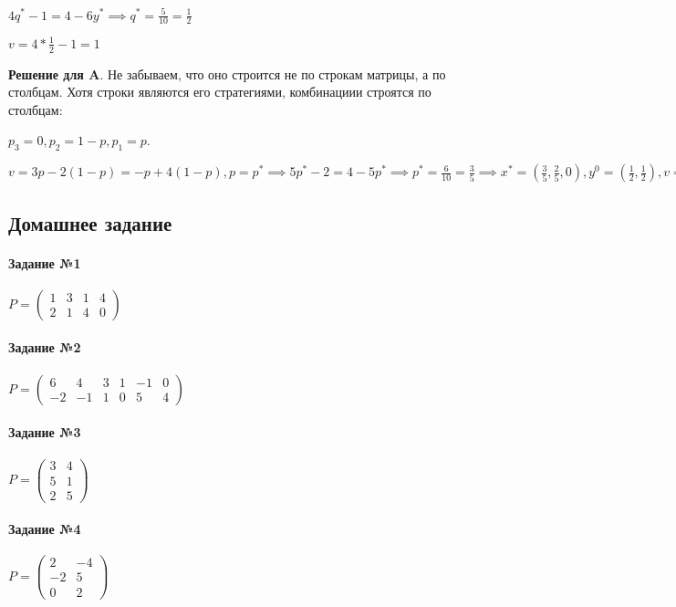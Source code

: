\documentclass{article}
\begin{document}
$4q^{*} - 1 = 4 - 6y^{*} \implies q^{*} = \frac{5}{10} = \frac{1}{2}$

$v = 4 * \frac{1}{2} - 1 = 1$

\textbf{Решение для A}. Не забываем, что оно строится не по строкам матрицы, а по столбцам. Хотя строки являются его стратегиями, комбинациии строятся по столбцам:

$p_{3} = 0, p_{2} = 1 - p, p_{1} = p$.

$v = 3p - 2 (1 - p) = -p + 4(1 - p), p = p^{*} \implies 5p^{*} - 2 = 4 - 5p^{*} \implies p^{*} = \frac{6}{10} = \frac{3}{5} \implies x^{*} = ( \frac{3}{5}, \frac{2}{5}, 0), y^{0} = (\frac{1}{2}, \frac{1}{2}), v = 5 * \frac{3}{5} - 2 = 3 - 2 = 1$

\subsection{Домашнее задание}

\paragraph{Задание №1} $P = \begin{pmatrix}
	1 & 3 & 1 & 4 \\
	2 & 1 & 4 & 0
\end{pmatrix}$

\paragraph{Задание №2} $P = \begin{pmatrix}
	6 & 4 & 3 & 1 & -1 & 0 \\
	-2 & -1 & 1 & 0 & 5 & 4
\end{pmatrix}$

\paragraph{Задание №3} $P = \begin{pmatrix}
	3 & 4 \\
	5 & 1 \\
	2 & 5
\end{pmatrix}$

\paragraph{Задание №4} $P = \begin{pmatrix}
	2 & -4 \\
	-2 & 5 \\
	0 & 2
\end{pmatrix}$
\end{document}
